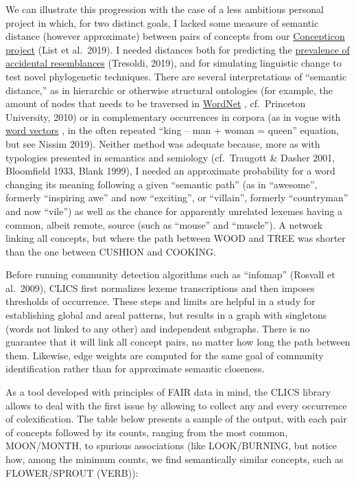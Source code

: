 \documentclass[
  a4paper,
  14pt,
  oneside,
  tablecaptionabove
]{scrbook}
\begin{document}
We can illustrate this progression with the case of a less ambitious
personal project in which, for two distinct goals, I lacked some measure
of semantic distance (however approximate) between pairs of concepts
from our \href{https://concepticon.clld.org/}{Concepticon project} (List
et al.~2019). I needed distances both for predicting the
\href{https://speakerdeck.com/tresoldi/a-cross-linguistic-computational-approach-on-chance-resemblances}{prevalence
of accidental resemblances} (Tresoldi, 2019), and for simulating
linguistic change to test novel phylogenetic techniques. There are
several interpretations of \enquote{semantic distance,} as in hierarchic
or otherwise structural ontologies (for example, the amount of nodes
that needs to be traversed in
\href{https://wordnet.princeton.edu/}{WordNet} , cf.~Princeton
University, 2010) or in complementary occurrences in corpora (as in
vogue with \href{https://en.wikipedia.org/wiki/Word_embedding}{word
vectors} , in the often repeated \enquote{king -- man + woman = queen}
equation, but see Nissim 2019). Neither method was adequate because,
more as with typologies presented in semantics and semiology
(cf.~Traugott \& Dasher 2001, Bloomfield 1933, Blank 1999), I needed an
approximate probability for a word changing its meaning following a
given \enquote{semantic path} (as in \enquote{awesome}, formerly
\enquote{inspiring awe} and now \enquote{exciting}, or
\enquote{villain}, formerly \enquote{countryman} and now \enquote{vile})
as well as the chance for apparently unrelated lexemes having a common,
albeit remote, source (such as \enquote{mouse} and \enquote{muscle}). A
network linking all concepts, but where the path between WOOD and TREE
was shorter than the one between CUSHION and COOKING.

Before running community detection algorithms such as \enquote{infomap}
(Rosvall et al.~2009), CLICS first normalizes lexeme transcriptions and
then imposes thresholds of occurrence. These steps and limits are
helpful in a study for establishing global and areal patterns, but
results in a graph with singletons (words not linked to any other) and
independent subgraphs. There is no guarantee that it will link all
concept pairs, no matter how long the path between them. Likewise, edge
weights are computed for the same goal of community identification
rather than for approximate semantic closeness.

As a tool developed with principles of FAIR data in mind, the CLICS
library allows to deal with the first issue by allowing to collect any
and every occurrence of colexification. The table below presents a
sample of the output, with each pair of concepts followed by its counts,
ranging from the most common, MOON/MONTH, to spurious associations (like
LOOK/BURNING, but notice how, among the minimum counts, we find
semantically similar concepts, such as FLOWER/SPROUT (VERB)):
\end{document}
